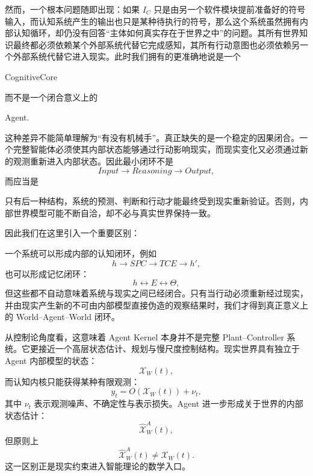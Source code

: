 然而，一个根本问题随即出现：如果 $I_C$ 只是由另一个软件模块提前准备好的符号输入，而认知系统产生的输出也只是某种待执行的符号，那么这个系统虽然拥有内部认知循环，却仍没有回答“主体如何真实存在于世界之中”的问题。其所有世界知识最终都必须依赖某个外部系统代替它完成感知，其所有行动意图也必须依赖另一个外部系统代替它进入现实。此时我们拥有的更准确地说是一个
\begin{statementbox}
CognitiveCore
\end{statementbox}
而不是一个闭合意义上的
\begin{statementbox}
Agent.
\end{statementbox}

这种差异不能简单理解为“有没有机械手”。真正缺失的是一个稳定的因果闭合。一个完整智能体必须使其内部状态能够通过行动影响现实，而现实变化又必须通过新的观测重新进入内部状态。因此最小闭环不是
\[
Input
\rightarrow
Reasoning
\rightarrow
Output,
\]
而应当是
\begin{statementbox}
\centering
{}
\end{statementbox}
只有后一种结构，系统的预测、判断和行动才能最终受到现实重新验证。否则，内部世界模型可能不断自洽，却不必与真实世界保持一致。

因此我们在这里引入一个重要区别：
\begin{statementbox}
\centering
{}
\end{statementbox}
一个系统可以形成内部的认知闭环，例如
\[
h
\rightarrow
SPC
\rightarrow
TCE
\rightarrow
h',
\]
也可以形成记忆闭环：
\[
h
\leftrightarrow
E
\leftrightarrow
\Theta,
\]
但这些都不自动意味着系统与现实之间已经闭合。只有当行动必须重新经过现实，并由现实产生新的不可由内部模型直接伪造的观察结果时，我们才得到真正意义上的 World--Agent--World 闭环。

从控制论角度看，这意味着 Agent Kernel 本身并不是完整 Plant--Controller 系统。它更接近一个高层状态估计、规划与慢尺度控制结构。现实世界具有独立于 Agent 内部模型的状态：
\[
\mathcal{X}_{W}(t),
\]
而认知内核只能获得某种有限观测：
\[
y_t
=
O
\left(
\mathcal{X}_{W}(t)
\right)
+
\nu_t,
\]
其中 $\nu_t$ 表示观测噪声、不确定性与表示损失。Agent 进一步形成关于世界的内部状态估计：
\[
\hat{\mathcal{X}}_{W}^{A}(t),
\]
但原则上
\[
\boxed{
\hat{\mathcal{X}}_{W}^{A}(t)
\neq
\mathcal{X}_{W}(t).
}
\]
这一区别正是现实约束进入智能理论的数学入口。

